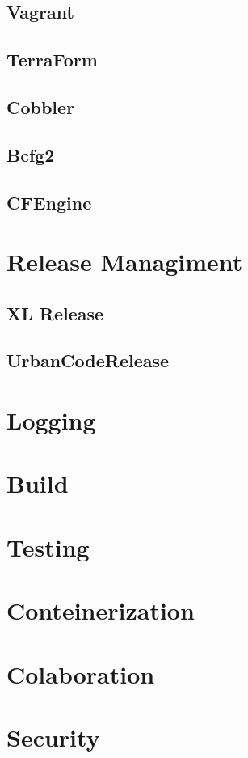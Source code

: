 	\subsection{Vagrant}
	\subsection{TerraForm}
	\subsection{Cobbler}
	\subsection{Bcfg2}
	\subsection{CFEngine}
	
    \section{Release Managiment}

	\subsection{XL Release}
	\subsection{UrbanCodeRelease}

    \section{Logging}
    \section{Build}
    \section{Testing}
    \section{Conteinerization}
    \section{Colaboration}
    \section{Security}
    
	
	
	
	
	
	
	
	
	
	
	
	
	
